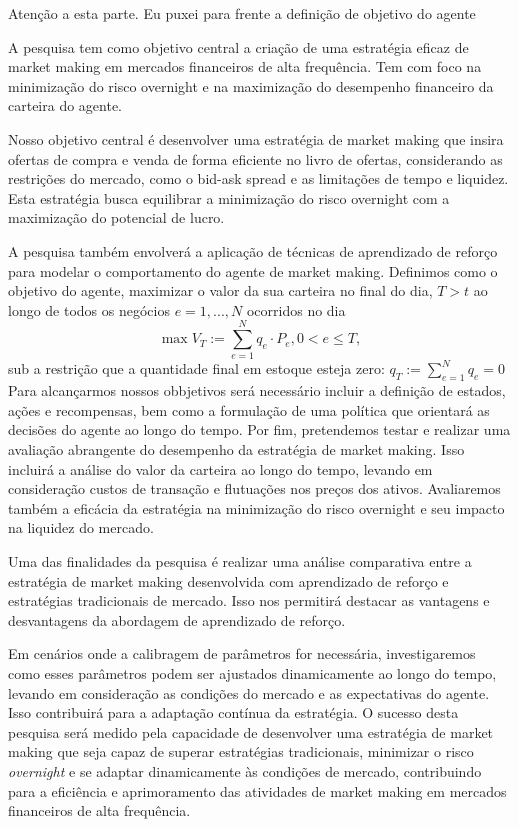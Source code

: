 

Atenção a esta parte. Eu puxei para frente a definição de objetivo do agente

A pesquisa tem como objetivo central a criação de uma estratégia eficaz de market making em mercados financeiros de alta frequência. Tem com foco na minimização do risco overnight e na maximização do desempenho financeiro da carteira do agente. 

Nosso objetivo central é desenvolver uma estratégia de market making que insira ofertas de compra e venda de forma eficiente no livro de ofertas, considerando as restrições do mercado, como o bid-ask spread e as limitações de tempo e liquidez. Esta estratégia busca equilibrar a minimização do risco overnight com a maximização do potencial de lucro.

A pesquisa também envolverá a aplicação de técnicas de aprendizado de reforço para modelar o comportamento do agente de market making. Definimos como o objetivo do agente, maximizar o valor da sua carteira no final do dia, $T>t$ ao longo de todos os negócios $e=1,...,N$ ocorridos no dia
\begin{equation*}
    \max V_T := \sum_{e=1}^N q_e \cdot P_e, 0<e\leq T, 
\end{equation*}
sub a restrição que a quantidade final em estoque esteja zero: $q_T:= \sum_{e=1}^N q_e = 0$
Para alcançarmos nossos obbjetivos será necessário incluir a definição de estados, ações e recompensas, bem como a formulação de uma política que orientará as decisões do agente ao longo do tempo. Por fim, pretendemos testar e realizar uma avaliação abrangente do desempenho da estratégia de market making. Isso incluirá a análise do valor da carteira ao longo do tempo, levando em consideração custos de transação e flutuações nos preços dos ativos. Avaliaremos também a eficácia da estratégia na minimização do risco overnight e seu impacto na liquidez do mercado.

Uma das finalidades da pesquisa é realizar uma análise comparativa entre a estratégia de market making desenvolvida com aprendizado de reforço e estratégias tradicionais de mercado. Isso nos permitirá destacar as vantagens e desvantagens da abordagem de aprendizado de reforço.

Em cenários onde a calibragem de parâmetros for necessária, investigaremos como esses parâmetros podem ser ajustados dinamicamente ao longo do tempo, levando em consideração as condições do mercado e as expectativas do agente. Isso contribuirá para a adaptação contínua da estratégia. O sucesso desta pesquisa será medido pela capacidade de desenvolver uma estratégia de market making que seja capaz de superar estratégias tradicionais, minimizar o risco \textit{overnight} e se adaptar dinamicamente às condições de mercado, contribuindo para a eficiência e aprimoramento das atividades de market making em mercados financeiros de alta frequência.

